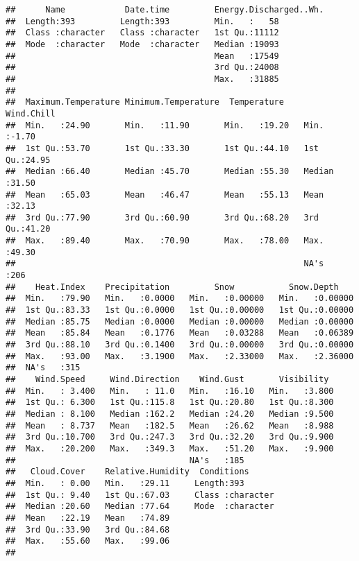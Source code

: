 \documentclass[
]{article}
\begin{document}
\begin{verbatim}
##      Name            Date.time         Energy.Discharged..Wh.
##  Length:393         Length:393         Min.   :   58         
##  Class :character   Class :character   1st Qu.:11112         
##  Mode  :character   Mode  :character   Median :19093         
##                                        Mean   :17549         
##                                        3rd Qu.:24008         
##                                        Max.   :31885         
##                                                              
##  Maximum.Temperature Minimum.Temperature  Temperature      Wind.Chill   
##  Min.   :24.90       Min.   :11.90       Min.   :19.20   Min.   :-1.70  
##  1st Qu.:53.70       1st Qu.:33.30       1st Qu.:44.10   1st Qu.:24.95  
##  Median :66.40       Median :45.70       Median :55.30   Median :31.50  
##  Mean   :65.03       Mean   :46.47       Mean   :55.13   Mean   :32.13  
##  3rd Qu.:77.90       3rd Qu.:60.90       3rd Qu.:68.20   3rd Qu.:41.20  
##  Max.   :89.40       Max.   :70.90       Max.   :78.00   Max.   :49.30  
##                                                          NA's   :206    
##    Heat.Index    Precipitation         Snow           Snow.Depth     
##  Min.   :79.90   Min.   :0.0000   Min.   :0.00000   Min.   :0.00000  
##  1st Qu.:83.33   1st Qu.:0.0000   1st Qu.:0.00000   1st Qu.:0.00000  
##  Median :85.75   Median :0.0000   Median :0.00000   Median :0.00000  
##  Mean   :85.84   Mean   :0.1776   Mean   :0.03288   Mean   :0.06389  
##  3rd Qu.:88.10   3rd Qu.:0.1400   3rd Qu.:0.00000   3rd Qu.:0.00000  
##  Max.   :93.00   Max.   :3.1900   Max.   :2.33000   Max.   :2.36000  
##  NA's   :315                                                         
##    Wind.Speed     Wind.Direction    Wind.Gust       Visibility   
##  Min.   : 3.400   Min.   : 11.0   Min.   :16.10   Min.   :3.800  
##  1st Qu.: 6.300   1st Qu.:115.8   1st Qu.:20.80   1st Qu.:8.300  
##  Median : 8.100   Median :162.2   Median :24.20   Median :9.500  
##  Mean   : 8.737   Mean   :182.5   Mean   :26.62   Mean   :8.988  
##  3rd Qu.:10.700   3rd Qu.:247.3   3rd Qu.:32.20   3rd Qu.:9.900  
##  Max.   :20.200   Max.   :349.3   Max.   :51.20   Max.   :9.900  
##                                   NA's   :185                    
##   Cloud.Cover    Relative.Humidity  Conditions       
##  Min.   : 0.00   Min.   :29.11     Length:393        
##  1st Qu.: 9.40   1st Qu.:67.03     Class :character  
##  Median :20.60   Median :77.64     Mode  :character  
##  Mean   :22.19   Mean   :74.89                       
##  3rd Qu.:33.90   3rd Qu.:84.68                       
##  Max.   :55.60   Max.   :99.06                       
## 
\end{verbatim}
\end{document}
